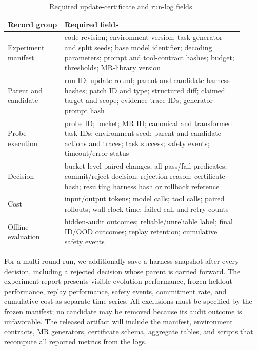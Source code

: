\documentclass{article}
\begin{document}
\begin{table}[t]
\caption{Required update-certificate and run-log fields.}
\label{tab:log-fields}
\centering
\small
\begin{tabular}{p{0.22\linewidth}p{0.69\linewidth}}
\toprule
Record group & Required fields \\
\midrule
Experiment manifest & code revision; environment version; task-generator and split seeds; base model identifier; decoding parameters; prompt and tool-contract hashes; budget; thresholds; MR-library version \\
Parent and candidate & run ID; update round; parent and candidate harness hashes; patch ID and type; structured diff; claimed target and scope; evidence-trace IDs; generator prompt hash \\
Probe execution & probe ID; bucket; MR ID; canonical and transformed task IDs; environment seed; parent and candidate actions and traces; task success; safety events; timeout/error status \\
Decision & bucket-level paired changes; all pass/fail predicates; commit/reject decision; rejection reason; certificate hash; resulting harness hash or rollback reference \\
Cost & input/output tokens; model calls; tool calls; paired rollouts; wall-clock time; failed-call and retry counts \\
Offline evaluation & hidden-audit outcomes; reliable/unreliable label; final ID/OOD outcomes; replay retention; cumulative safety events \\
\bottomrule
\end{tabular}
\end{table}

For a multi-round run, we additionally save a harness snapshot after every decision, including a rejected decision whose parent is carried forward. The experiment report presents visible evolution performance, frozen heldout performance, replay performance, safety events, commitment rate, and cumulative cost as separate time series. All exclusions must be specified by the frozen manifest; no candidate may be removed because its audit outcome is unfavorable. The released artifact will include the manifest, environment contracts, MR generators, certificate schema, aggregate tables, and scripts that recompute all reported metrics from the logs.



\end{document}
